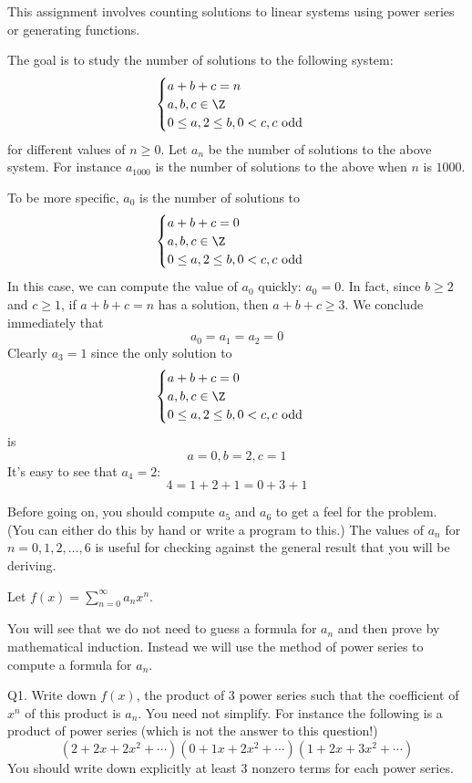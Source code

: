 \documentclass[a4paper,12pt]{article}
\begin{document}
\topmatter

This assignment involves counting solutions
to linear systems using power series or generating
functions.


The goal is to study the number of solutions to the following system:
\[
\begin{cases}
a + b + c = n \\
a,b,c \in \Z \\
0 \leq a, 2 \leq b, 0 < c, c \text{ odd}
\end{cases}
\]
for different values of $n \geq 0$.
Let $a_n$ be the number of solutions to the above system.
For instance $a_{1000}$ is the number of solutions to the above when 
$n$ is $1000$.

To be more specific, $a_0$ is the number of solutions to
\[
\begin{cases}
a + b + c = 0 \\
a,b,c \in \Z \\
0 \leq a, 2 \leq b, 0 < c, c \text{ odd}
\end{cases}
\]
In this case, we can compute the value of $a_0$ quickly: $a_0 = 0$.
In fact, since $b \geq 2$ and $c \geq 1$, if $a + b + c  = n$ has a solution,
then $a + b + c \geq 3$.
We conclude immediately that
\[
a_0 = a_1 = a_2 = 0
\]
Clearly $a_3 = 1$ since the only solution to 
\[
\begin{cases}
a + b + c = 0 \\
a,b,c \in \Z \\
0 \leq a, 2 \leq b, 0 < c, c \text{ odd}
\end{cases}
\]
is
\[
a = 0, b = 2, c = 1
\]
It's easy to see that $a_4 = 2$:
\[
4 = 1 + 2 + 1 = 0 + 3 + 1
\]

Before going on, you should compute $a_5$ and $a_6$ to get a feel for the 
problem.
(You can either do this by hand or write a program to this.)
The values of $a_n$ for $n = 0, 1, 2, \ldots, 6$ is useful for checking
against the general result that you will be deriving.

Let $f(x) = \sum_{n=0}^\infty a_n x^n$.

You will see that we do not need to guess a formula for $a_n$
and then prove by mathematical induction.
Instead we will use the method of power series to compute a formula
for $a_n$.

\newpage
Q1. Write down $f(x)$, 
the product of 3 power series such that the coefficient of 
$x^n$ of this product is $a_n$. 
You need not simplify. 
For instance the following is a product of power series (which is not
the answer to this question!)
\[
(2 + 2x + 2x^2 + \cdots)
(0 + 1x + 2x^2 + \cdots)
(1 + 2x + 3x^2 + \cdots)
\]
You should write down explicitly at least 3 nonzero terms for each power 
series.
\end{document}
